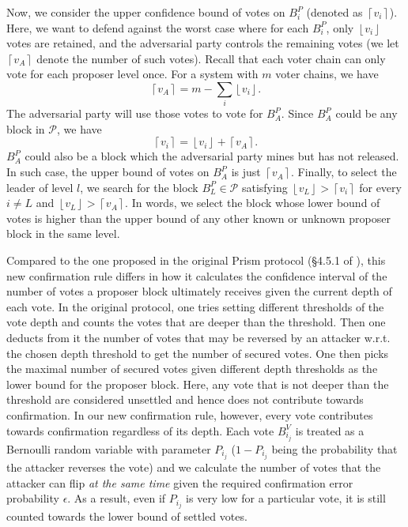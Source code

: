 Now, we consider the upper confidence bound of votes on $B_i^P$ (denoted as $\left \lceil v_{i} \right \rceil$). Here, we want to defend against the worst case where for each $B_i^P$, only $\left \lfloor v_{i} \right \rfloor$ votes are retained, and the adversarial party controls the remaining votes (we let $\left \lceil v_A \right \rceil$ denote the number of such votes). Recall that each voter chain can only vote for each proposer level once. For a system with $m$ voter chains, we have
$$\left \lceil v_A \right \rceil = m - \sum_{i}\left \lfloor v_{i} \right \rfloor.$$
The adversarial party will use those votes to vote for $B^P_A$. Since $B^P_A$ could be any block in $\mathcal P$, we have
$$\left \lceil v_i \right \rceil = \left \lfloor v_{i} \right \rfloor + \left \lceil v_A \right \rceil.$$
$B^P_A$ could also be a block which the adversarial party mines but has not released. In such case, the upper bound of votes on $B^P_A$ is just $\left \lceil v_A \right \rceil$. Finally, to select the leader of level $l$, we search for the block $B^P_L \in \mathcal P$ satisfying $\left \lfloor v_{L} \right \rfloor > \left \lceil v_i \right \rceil$ for every $i \neq L$ and $\left \lfloor v_{L} \right \rfloor > \left \lceil v_A \right \rceil$. In words, we select the block whose lower bound of votes is higher than the upper bound of any other known or unknown proposer block in the same level.

Compared to the one proposed in the original Prism protocol (\S4.5.1 of \cite{prism-theory}), this new confirmation rule differs in how it calculates the confidence interval of the number of votes a proposer block ultimately receives given the current depth of each vote. In the original protocol, one tries setting different thresholds of the vote depth and counts the votes that are deeper than the threshold. Then one deducts from it the number of votes that may be reversed by an attacker w.r.t. the chosen depth threshold to get the number of secured votes. One then picks the maximal number of secured votes given different depth thresholds as the lower bound for the proposer block. Here, any vote that is not deeper than the threshold are considered unsettled and hence does not contribute towards confirmation. In our new confirmation rule, however, every vote contributes towards confirmation regardless of its depth. Each vote $B^V_{i_j}$ is treated as a Bernoulli random variable with parameter $P_{i_j}$ ($1-P_{i_j}$ being the probability that the attacker reverses the vote) and we calculate the number of votes that the attacker can flip \textit{at the same time} given the required confirmation error probability $\epsilon$. As a result, even if $P_{i_j}$ is very low for a particular vote, it is still counted towards the lower bound of settled votes.

